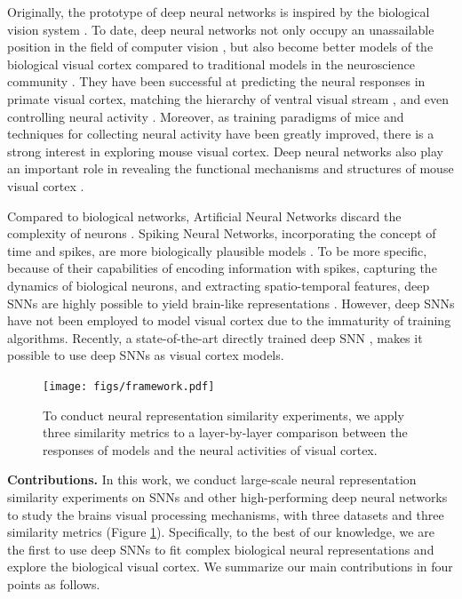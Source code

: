 \documentclass[letterpaper]{article} %
\begin{document}
Originally, the prototype of deep neural networks is inspired by the biological vision system \cite{hubel1959receptive, hubel1962receptive}. To date, deep neural networks not only occupy an unassailable position in the field of computer vision \cite{lecun2015deep}, but also become better models of the biological visual cortex compared to traditional models in the neuroscience community \cite{khaligh2014deep, yamins2014performance, yamins2016using}. They have been successful at predicting the neural responses in primate visual cortex, matching the hierarchy of ventral visual stream \cite{gucclu2015deep, kubilius2019brain, nayebi2018task, kietzmann2019recurrence}, and even controlling neural activity \cite{bashivan2019neural, ponce2019evolving}. Moreover, as training paradigms of mice \cite{zoccolan2009rodent} and techniques for collecting neural activity \cite{de2020large} have been greatly improved, there is a strong interest in exploring mouse visual cortex. Deep neural networks also play an important role in revealing the functional mechanisms and structures of mouse visual cortex \cite{shi2019comparison, cadena2019well, nayebi2022mouse, bakhtiari2021functional, conwell2021neural}.

Compared to biological networks, Artificial Neural Networks discard the complexity of neurons \cite{pham2008control}. Spiking Neural Networks, incorporating the concept of time and spikes, are more biologically plausible models \cite{maass1997networks}. To be more specific, because of their capabilities of encoding information with spikes, capturing the dynamics of biological neurons, and extracting spatio-temporal features, deep SNNs are highly possible to yield brain-like representations \cite{hodgkin1952quantitative, gerstner2002spiking, izhikevich2004model, brette2007simulation, kasabov2013dynamic}. However, deep SNNs have not been employed to model visual cortex due to the immaturity of training algorithms. Recently, a state-of-the-art directly trained deep SNN \cite{fang2021deep}, makes it possible to use deep SNNs as visual cortex models.

\begin{figure}[t]
	\centering
	\texttt{[image: figs/framework.pdf]}
	\caption{To conduct neural representation similarity experiments, we apply three similarity metrics to a layer-by-layer comparison between the responses of models and the neural activities of visual cortex.}
	\label{Fig.flowsheet}
\end{figure}

\textbf{Contributions.} In this work, we conduct large-scale neural representation similarity experiments on SNNs and other high-performing deep neural networks to study the brains visual processing mechanisms, with three datasets and three similarity metrics (Figure \ref{Fig.flowsheet}). Specifically, to the best of our knowledge, we are the first to use deep SNNs to fit complex biological neural representations and explore the biological visual cortex. We summarize our main contributions in four points as follows.
\end{document}
